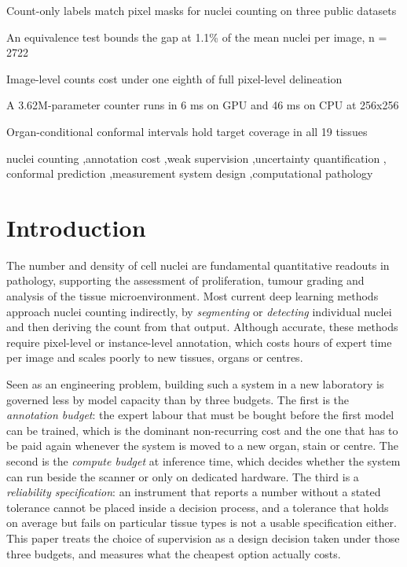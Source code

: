 \documentclass[preprint,12pt]{elsarticle}
\begin{document}
\begin{frontmatter}
\begin{highlights}
\item Count-only labels match pixel masks for nuclei counting on three public datasets
\item An equivalence test bounds the gap at 1.1\% of the mean nuclei per image, n = 2722
\item Image-level counts cost under one eighth of full pixel-level delineation
\item A 3.62M-parameter counter runs in 6 ms on GPU and 46 ms on CPU at 256x256
\item Organ-conditional conformal intervals hold target coverage in all 19 tissues
\end{highlights}

\begin{keyword}
nuclei counting \sep annotation cost \sep weak supervision \sep uncertainty quantification \sep
conformal prediction \sep measurement system design \sep computational pathology
\end{keyword}

\end{frontmatter}

\section{Introduction}\label{sec:intro}

The number and density of cell nuclei are fundamental quantitative readouts in pathology, supporting the
assessment of proliferation, tumour grading and analysis of the tissue microenvironment. Most current deep
learning methods approach nuclei counting indirectly, by \emph{segmenting} or \emph{detecting} individual
nuclei and then deriving the count from that output. Although accurate, these methods require pixel-level or
instance-level annotation, which costs hours of expert time per image and scales poorly to new tissues, organs
or centres.

Seen as an engineering problem, building such a system in a new laboratory is governed less by model capacity
than by three budgets. The first is the \emph{annotation budget}: the expert labour that must be bought before
the first model can be trained, which is the dominant non-recurring cost and the one that has to be paid again
whenever the system is moved to a new organ, stain or centre. The second is the \emph{compute budget} at
inference time, which decides whether the system can run beside the scanner or only on dedicated hardware. The
third is a \emph{reliability specification}: an instrument that reports a number without a stated tolerance
cannot be placed inside a decision process, and a tolerance that holds on average but fails on particular
tissue types is not a usable specification either. This paper treats the choice of supervision as a design
decision taken under those three budgets, and measures what the cheapest option actually costs.
\end{document}

